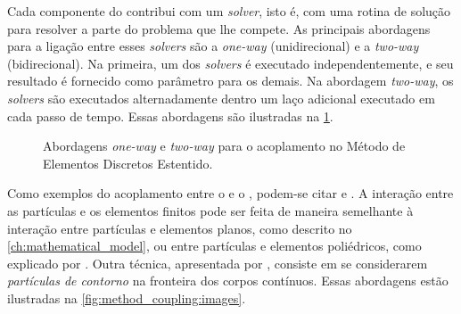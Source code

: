 Cada componente do \XDEM{} contribui com um \textit{solver}, isto é, com uma rotina de solução para resolver a parte do problema que lhe compete. As principais abordagens para a ligação entre esses \textit{solvers} são a \textit{one-way} (unidirecional) e a \textit{two-way} (bidirecional). Na primeira, um dos \textit{solvers} é executado independentemente, e seu resultado é fornecido como parâmetro para os demais. Na abordagem \textit{two-way}, os \textit{solvers} são executados alternadamente dentro um laço adicional executado em cada passo de tempo. Essas abordagens são ilustradas na \cref{fig:method_coupling:flowchart}.

\begin{figure}[h]
	\caption{Abordagens \textit{one-way} e \textit{two-way} para o acoplamento no Método de Elementos Discretos Estentido.}
	\centering
	\captionsetup[subfloat]{labelfont=bf}
	\label{fig:method_coupling:flowchart}
	\sourceMe
\end{figure}

Como exemplos do acoplamento entre o \DEM{} e o \FEM{}, podem-se citar  e . A interação entre as partículas e os elementos finitos pode ser feita de maneira semelhante à interação entre partículas e elementos planos, como descrito no \cref{ch:mathematical_model}, ou entre partículas e elementos poliédricos, como explicado por . Outra técnica, apresentada por , consiste em se considerarem \textit{partículas de contorno} na fronteira dos corpos contínuos. Essas abordagens estão ilustradas na \cref{fig:method_coupling:images}.

